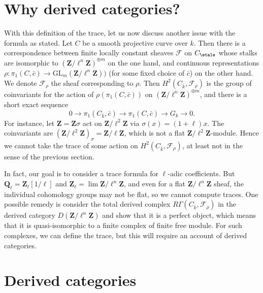 \section{Why derived categories?}
\label{section-derived-categories-why}

\noindent
With this definition of the trace, let us now discuss another issue with the
formula as stated. Let $C$ be a smooth projective curve over $k$. Then there is
a correspondence between finite locally constant sheaves $\mathcal{F}$ on
$C_\etale$ whose stalks are isomorphic to
${(\mathbf{Z}/\ell^n\mathbf{Z})}^{\oplus m}$ on the one hand, and continuous
representations $\rho : \pi_1 (C, \bar c) \to
\text{GL}_m(\mathbf{Z}/\ell^n\mathbf{Z}))$ (for some fixed choice of $\bar c$)
on the other hand. We denote $\mathcal{F}_\rho$ the sheaf corresponding to
$\rho$. Then $H^2 (C_{\bar k}, \mathcal{F}_\rho)$ is the group of coinvariants
for the action of $\rho(\pi_1 (C, \bar c))$ on
${(\mathbf{Z}/\ell^n\mathbf{Z})}^{\oplus m}$, and there is a short exact
sequence
$$
0 \longrightarrow \pi_1 (C_{\bar k}, \bar c) \longrightarrow \pi_1 (C, \bar c)
\longrightarrow G_k \longrightarrow 0.
$$
For instance, let $\mathbf{Z} = \mathbf{Z} \sigma$ act on
$\mathbf{Z}/\ell^2\mathbf{Z}$ via $\sigma(x) = (1+\ell) x$. The coinvariants
are $(\mathbf{Z}/\ell^2\mathbf{Z})_{\sigma} = \mathbf{Z}/\ell\mathbf{Z}$, which
is not a flat $\mathbf{Z}/\ell^2\mathbf{Z}$-module. Hence we cannot take the
trace of some action on $H^2(C_{\bar k}, \mathcal{F}_\rho)$, at least not in
the sense of the previous section.

\medskip\noindent
In fact, our goal is to consider a trace formula for $\ell$-adic coefficients.
But $\mathbf{Q}_\ell = \mathbf{Z}_\ell[1/\ell]$ and $\mathbf{Z}_\ell =
\lim \mathbf{Z}/\ell^n\mathbf{Z}$, and even for a flat
$\mathbf{Z}/\ell^n\mathbf{Z}$ sheaf, the individual cohomology groups may not
be flat, so we cannot compute traces. One possible remedy is consider the total
derived complex $R\Gamma(C_{\bar k}, \mathcal{F}_\rho)$ in the derived category
$D(\mathbf{Z}/\ell^n\mathbf{Z})$ and show that it is a perfect object, which
means that it is quasi-isomorphic to a finite complex of finite free module.
For such complexes, we can define the trace, but this will require an account
of derived categories.






\section{Derived categories}
\label{section-derived-categories}

